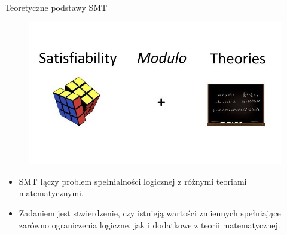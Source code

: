 \begin{frame}{Teoretyczne podstawy SMT}
	\begin{figure}[htbp]
		\centering
		\begin{minipage}{\textheight}
			\includegraphics[width=\textheight]{./slides/smt.jpg}
		\end{minipage}
	\end{figure}
    \begin{itemize}
    	\item SMT łączy problem spełnialności logicznej z różnymi teoriami matematycznymi.
    	\item Zadaniem jest stwierdzenie, czy istnieją wartości zmiennych spełniające zarówno ograniczenia logiczne, jak i dodatkowe z teorii matematycznej.
    \end{itemize}
\end{frame}